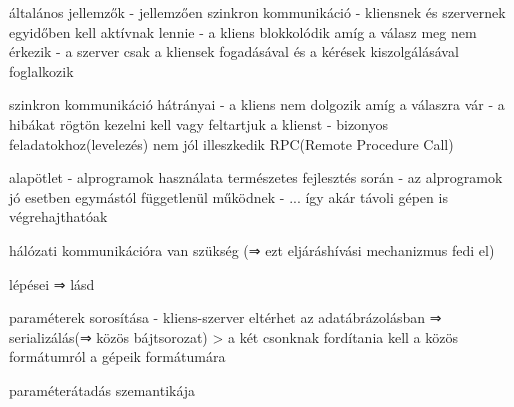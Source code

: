 \documentclass[twoside, a4paper, 12pt]{article}
\begin{document}
\begin{description}
                                                                    \item általános jellemzők
                                                                        - jellemzően szinkron kommunikáció
                                                                        - kliensnek és szervernek egyidőben kell aktívnak lennie
                                                                        - a kliens blokkolódik amíg a válasz meg nem érkezik
                                                                        - a szerver csak a kliensek fogadásával és a kérések kiszolgálásával foglalkozik
                                                                    \item szinkron kommunikáció hátrányai
                                                                        - a kliens nem dolgozik amíg a válaszra vár
                                                                        - a hibákat rögtön kezelni kell vagy feltartjuk a klienst
                                                                        - bizonyos feladatokhoz(levelezés) nem jól illeszkedik
                                                                        RPC(Remote Procedure Call)
                                                                    \item alapötlet
                                                                        - alprogramok használata természetes fejlesztés során
                                                                        - az alprogramok jó esetben egymástól függetlenül működnek
                                                                        - ... így akár távoli gépen is végrehajthatóak
                                                                    \item hálózati kommunikációra van szükség (⇒ ezt eljáráshívási mechanizmus fedi el)
                                                                    \item lépései ⇒ lásd 
                                                                    \item paraméterek sorosítása
                                                                        - kliens-szerver eltérhet az adatábrázolásban ⇒ serializálás(⇒ közös bájtsorozat)
                                                                        > a két csonknak fordítania kell a közös formátumról a gépeik formátumára
                                                                    \item paraméterátadás szemantikája

\end{description}
\end{document}
